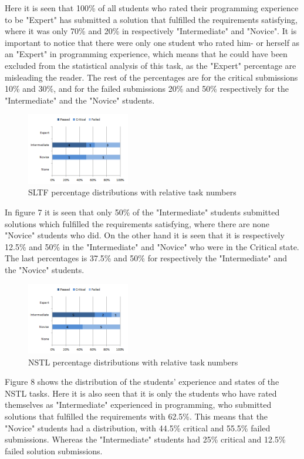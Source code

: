 \documentclass{sig-alternate-05-2015}
\begin{document}
Here it is seen that 100\% of all students who rated their programming experience to be "Expert" has submitted a solution that fulfilled the requirements satisfying, where it was only 70\% and 20\% in respectively "Intermediate" and "Novice".
It is important to notice that there were only one student who rated him- or herself as an "Expert" in programming experience, which means that he could have been excluded from the statistical analysis of this task, as the "Expert" percentage are misleading the reader. The rest of the percentages are for the critical submissions 10\% and 30\%, and for the failed submissions 20\% and 50\% respectively for the "Intermediate" and the "Novice" students.

\begin{figure}[H]
	\centering
	\includegraphics[width=0.4\textwidth]{img07}
	\caption{SLTF percentage distributions with relative task numbers}
\end{figure}

In figure 7 it is seen that only 50\% of the "Intermediate" students submitted solutions which fulfilled the requirements satisfying, where there are none "Novice" students who did. On the other hand it is seen that it is respectively 12.5\% and 50\% in the "Intermediate" and "Novice" who were in the Critical state. The last percentages is 37.5\% and 50\% for respectively the "Intermediate" and the "Novice" students.

\begin{figure}[H]
	\centering
	\includegraphics[width=0.4\textwidth]{img08}
	\caption{NSTL percentage distributions with relative task numbers}
\end{figure}

Figure 8 shows the distribution of the students' experience and states of the NSTL tasks. Here it is also seen that it is only the students who have rated themselves as "Intermediate" experienced in programming, who submitted solutions that fulfilled the requirements with 62.5\%. This means that the "Novice" students had a distribution, with 44.5\% critical and 55.5\% failed submissions. Whereas the "Intermediate" students had 25\% critical and 12.5\% failed solution submissions.
\end{document}
